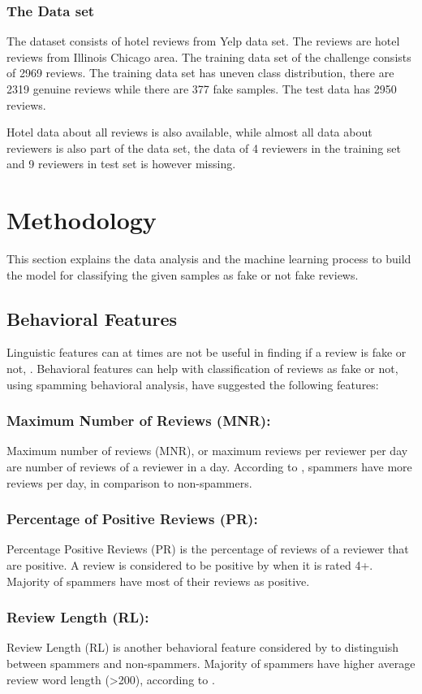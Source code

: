 \documentclass{llncs}
\begin{document}
\subsubsection{The Data set}
The dataset consists of hotel reviews from Yelp data set. The reviews are hotel reviews from Illinois Chicago area. The training data set of the challenge consists of 2969 reviews. The training data set has uneven class distribution, there are 2319 genuine reviews while there are 377 fake samples. The test data has 2950 reviews.

Hotel data about all reviews is also available, while almost all data about reviewers is also part of the data set, the data of 4 reviewers in the training set and 9 reviewers in test set is however missing.

\section{Methodology}
This section explains the data analysis and the machine learning process to build the model for classifying the given samples as fake  or not fake reviews. 
\subsection{Behavioral Features}
Linguistic features can at times are not be useful in finding if a review is fake or not,  \cite{arjun:et}. Behavioral features can help with classification of reviews as fake or not, using spamming behavioral analysis, \cite{arjun:et} have suggested the following features:
%
\subsubsection{Maximum Number of Reviews (MNR):}
%
Maximum number of reviews (MNR), or maximum reviews per reviewer per day are number of reviews of a reviewer in a day. According to \cite{arjun:et} , spammers have more reviews per day, in comparison to non-spammers. 
%
\subsubsection{Percentage of Positive Reviews (PR):}
%
Percentage Positive Reviews (PR) is the percentage of reviews of a reviewer that are positive. A review is considered to be positive by \cite{arjun:et} when it is rated 4+. Majority of spammers have most of their reviews as positive.
%
\subsubsection{Review Length (RL):}
%
Review Length (RL) is another behavioral feature considered by \cite{arjun:et} to distinguish between spammers and non-spammers. Majority of spammers have higher average review word length (>200), according to \cite{arjun:et}.
%
\end{document}
